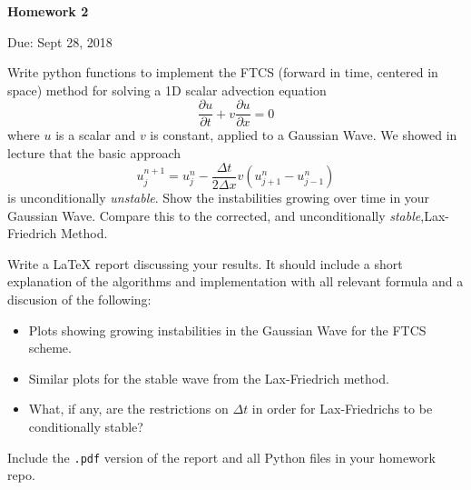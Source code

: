 \documentclass{article}
\begin{document}
\begin{center}

\vspace*{-2.5cm}
\LARGE
\bf{Homework 2}
\vspace{1cm}

\large{Due: Sept 28, 2018}
\vspace{1cm}

\end{center}

Write python functions to implement the FTCS (forward in time, centered in space) method for solving a 1D scalar advection equation
\begin{equation*}
   \frac{\partial u}{\partial t} + v \frac{\partial u}{\partial x} = 0
\end{equation*}
where $u$ is a scalar and $v$ is constant, applied to a Gaussian Wave. We showed in lecture that the basic approach
\begin{equation*}
   u_j^{n+1} = u^n_j - \frac{\Delta t}{2\Delta x}v \left( u^n_{j+1} - u^n_{j-1} \right) 
\end{equation*}
is unconditionally \emph{unstable}.  Show the instabilities growing over time in your Gaussian Wave.  Compare this to the corrected, and unconditionally \emph{stable},Lax-Friedrich Method.
\par
Write a \LaTeX{} report discussing your results.  It should include a short explanation of the algorithms and implementation with all relevant formula and a discusion of the following:
\begin{itemize}
   \item Plots showing growing instabilities in the Gaussian Wave for the FTCS scheme.
   \item Similar plots for the stable wave from the Lax-Friedrich method.
   \item What, if any, are the restrictions on $\Delta t$ in order for Lax-Friedrichs to be conditionally stable?
\end{itemize}
Include the \texttt{.pdf} version of the report and all Python files in your homework repo.
\end{document}
